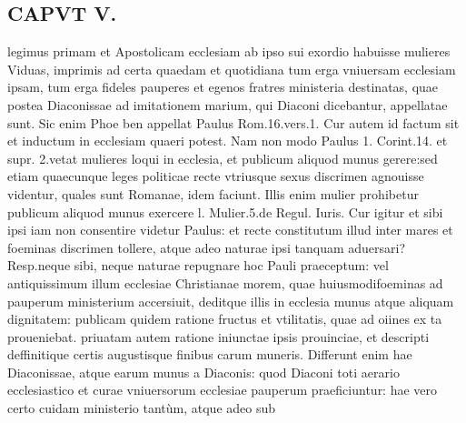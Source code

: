 \documentclass{article}
\begin{document}
\begin{pages}
\section*{CAPVT V. }
\marginpar{[ p.271 ]}\pstart legimus primam et Apostolicam ecclesiam ab ipso sui exordio habuisse mulieres Viduas, imprimis ad certa quaedam et quotidiana tum erga vniuersam ecclesiam ipsam, tum erga fideles pauperes et egenos fratres ministeria destinatas, quae postea Diaconissae ad imitationem marium, qui Diaconi dicebantur, appellatae sunt. Sic enim Phoe ben appellat Paulus Rom.16.vers.1. Cur autem id factum sit et inductum in ecclesiam quaeri potest. Nam non modo Paulus 1. Corint.14. et supr. 2.vetat mulieres loqui in ecclesia, et publicum aliquod munus gerere:sed etiam quaecunque leges politicae recte vtriusque sexus discrimen agnouisse videntur, quales sunt Romanae, idem faciunt. Illis enim mulier prohibetur publicum aliquod munus exercere l. Mulier.5.de Regul. Iuris. Cur igitur et sibi ipsi iam non consentire videtur Paulus: et recte constitutum illud inter mares et foeminas discrimen tollere, atque adeo naturae ipsi tanquam aduersari? Resp.neque sibi, neque naturae repugnare hoc Pauli praeceptum: vel antiquissimum illum ecclesiae Christianae morem, quae huiusmodifoeminas ad pauperum ministerium accersiuit, deditque illis in ecclesia munus atque aliquam dignitatem: publicam quidem ratione fructus et vtilitatis, quae ad oiines ex ta proueniebat. priuatam autem ratione iniunctae ipsis prouinciae, et descripti deffinitique  certis augustisque finibus carum muneris. Differunt enim hae Diaconissae, atque earum munus a Diaconis: quod Diaconi toti aerario ecclesiastico et curae vniuersorum ecclesiae pauperum praeficiuntur: hae vero certo cuidam ministerio tantùm, atque adeo sub  \pend

\end{pages}
\end{document}
